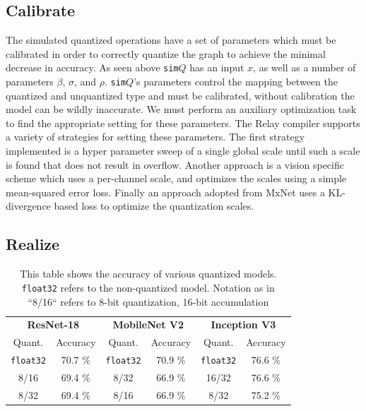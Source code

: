 
\subsection{Calibrate}
The simulated quantized operations have a set of parameters which must
  be calibrated in order to correctly quantize the graph to achieve the
  minimal decrease in accuracy.
As seen above \texttt{sim$Q$} has an input $x$, as well as a number of parameters
  $\beta$, $\sigma$, and $\rho$.
\texttt{sim$Q$}'s parameters control the mapping between the quantized and unquantized type
  and must be calibrated, without calibration the model can be wildly inaccurate.
We must perform an auxiliary optimization task to find the appropriate
  setting for these parameters.
The Relay compiler supports a variety of strategies for setting these
  parameters.
The first strategy implemented is a hyper parameter sweep of a
  single global scale until such a scale is found that does not result
  in overflow.
Another approach is a vision specific scheme which uses
  a per-channel scale, and optimizes the scales using a
  simple mean-squared error loss.
Finally an approach adopted from MxNet uses a
  KL-divergence based loss to optimize the
  quantization scales.

\subsection{Realize}

\begin{table}[t]
  \begin{tabular}{|c|c||c|c||c|c|}
    \hline
    \multicolumn{2}{|c}{\textbf{ResNet-18}} & \multicolumn{2}{c}{\textbf{MobileNet V2}} & \multicolumn{2}{c|}{\textbf{Inception V3}} \\
    \multicolumn{1}{|c}{Quant.}    & \multicolumn{1}{c}{Accuracy}   &  \multicolumn{1}{c}{Quant.}  & \multicolumn{1}{c}{Accuracy}  & \multicolumn{1}{c}{Quant.}  & \multicolumn{1}{c|}{Accuracy} \\
    \hline
    \texttt{float32} & 70.7 \%    & \texttt{float32} & 70.9 \%       & \texttt{float32} & 76.6 \% \\
    8/16         & 69.4 \%    & 8/32         & 66.9 \%       & 16/32        & 76.6 \% \\
    8/32         & 69.4 \%    & 8/16         & 66.9 \%       & 8/32         & 75.2 \% \\
    \hline
  \end{tabular}
  \caption{This table shows the accuracy of various quantized models.
    \texttt{float32} refers to the non-quantized model.
    Notation as in ``8/16`` refers to 8-bit quantization,
    16-bit accumulation}
  \label{fig:quant_results}
\end{table}

